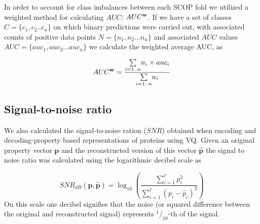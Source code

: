 In order to account for class imbalances between each SCOP fold we utilized a weighted method for calculating $AUC$: $AUC^{\bf{w}}$.  If we have a set of classes $C=\{c_{1},c_{2}..c_{n}\}$ on which binary predictions were carried out, with associated counts of positive data points $N=\{n_{1},n_{2}...n_{n}\}$ and associated $AUC$ values $AUC=\{auc_{1},auc_{2}...auc_{n}\}$ we calculate the weighted average AUC, as 

\[
AUC^{\bf{w}}=\frac{\underset{i=1..n}{\sum}n_{i}\times auc_{i}}{\underset{i=1..n}{\sum}n_{i}}
\]


\subsection{Signal-to-noise ratio}

We also calculated the signal-to-noise ration ($SNR$) obtained when encoding and decoding-property based representations of proteins using VQ. Given an original property vector $\mathbf{p}$ and the reconstructed version of this vector $\hat{\mathbf{p}}$ the signal to noise ratio was calculated using the logarithmic decibel scale as 

\[
SNR_{dB}(\mathbf{p},\hat{\mathbf{p}})=\log_{10}\left(\frac{\sum\limits _{i=1}^{\ell}p_{i}^{2}}{\sum\limits _{i=1}^{\ell}(p_{i}-\hat{p}_{i})^{2}}\right)
\]
On this scale one decibel signifies that the noise (or squared difference between the original and reconstructed signal) represents $^{1}/_{10}$-th of the signal. %


